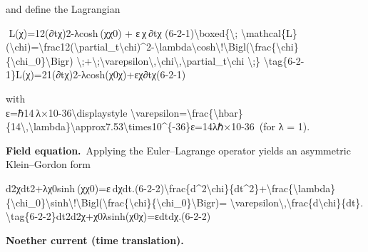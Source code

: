 \documentclass[
]{article}
\begin{document}
{and define the Lagrangian

  L(χ)=12(∂tχ)2-λcosh⁡ ⁣(χχ0)  +  ε χ ∂tχ  (6-2-1)\textbackslash boxed\{\textbackslash;
\textbackslash mathcal\{L\}(\textbackslash chi)=\textbackslash frac12(\textbackslash partial\_t\textbackslash chi)\^{}2-\textbackslash lambda\textbackslash cosh\textbackslash!\textbackslash Bigl(\textbackslash frac\{\textbackslash chi\}\{\textbackslash chi\_0\}\textbackslash Bigr)
\textbackslash;+\textbackslash;\textbackslash varepsilon\textbackslash,\textbackslash chi\textbackslash,\textbackslash partial\_t\textbackslash chi
\textbackslash;\}
\textbackslash tag\{6-2-1\}L(χ)=21\hspace{0pt}(∂t\hspace{0pt}χ)2-λcosh(χ0\hspace{0pt}χ\hspace{0pt})+εχ∂t\hspace{0pt}χ\hspace{0pt}(6-2-1)

with\\
ε=ℏ14 λ×10-36\textbackslash displaystyle
\textbackslash varepsilon=\textbackslash frac\{\textbackslash hbar\}\{14\textbackslash,\textbackslash lambda\}\textbackslash approx7.53\textbackslash times10\^{}\{-36\}ε=14λℏ\hspace{0pt}×10-36 (for
λ = 1).

\textbf{Field equation.} Applying the Euler--Lagrange operator yields an
asymmetric Klein--Gordon form

d2χdt2+λχ0sinh⁡ ⁣(χχ0)=ε dχdt.(6-2-2)\textbackslash frac\{d\^{}2\textbackslash chi\}\{dt\^{}2\}+\textbackslash frac\{\textbackslash lambda\}\{\textbackslash chi\_0\}\textbackslash sinh\textbackslash!\textbackslash Bigl(\textbackslash frac\{\textbackslash chi\}\{\textbackslash chi\_0\}\textbackslash Bigr)=
\textbackslash varepsilon\textbackslash,\textbackslash frac\{d\textbackslash chi\}\{dt\}.
\textbackslash tag\{6-2-2\}dt2d2χ\hspace{0pt}+χ0\hspace{0pt}λ\hspace{0pt}sinh(χ0\hspace{0pt}χ\hspace{0pt})=εdtdχ\hspace{0pt}.(6-2-2)

\textbf{Noether current (time translation).}

}
\end{document}
